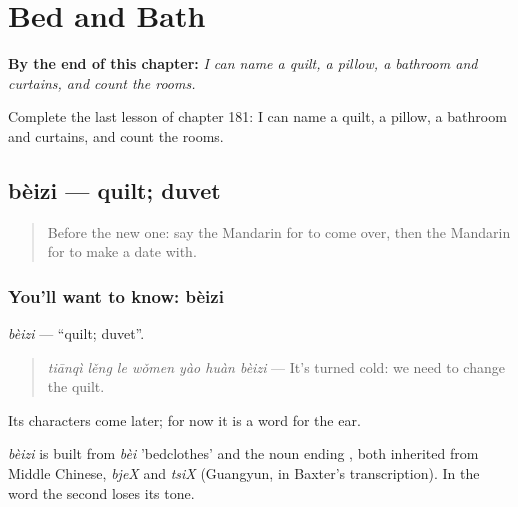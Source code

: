 
\chapter{Bed and Bath}
\label{ch:zh-bed-and-bath}

\begin{chapteropening}
\textbf{By the end of this chapter:} \emph{I can name a quilt, a pillow, a bathroom and curtains, and count the rooms.}

Complete the last lesson of chapter 181: I can name a quilt, a pillow, a bathroom and curtains, and count the rooms.
\end{chapteropening}

\section[bèizi]{bèizi — quilt; duvet}

\label{lesson:ZH-C181-beizi}



\begin{quote}
Before the new one: say the Mandarin for to come over, then the Mandarin for to make a date with.
\end{quote}

\subsection*{You'll want to know: bèizi}
\emph{bèizi} — \textquotedblleft{}quilt; duvet\textquotedblright{}.

\begin{quote}
\emph{tiānqì lěng le wǒmen yào huàn bèizi} — It's turned cold: we need to change the quilt.
\end{quote}

Its characters come later; for now it is a word for the ear.

\begin{cousinweb}
\emph{bèizi} is built from \emph{bèi} 'bedclothes' and the noun ending , both inherited from Middle Chinese, \emph{bjeX} and \emph{tsiX} (Guangyun, in Baxter's transcription). In the word the second loses its tone.
\end{cousinweb}

